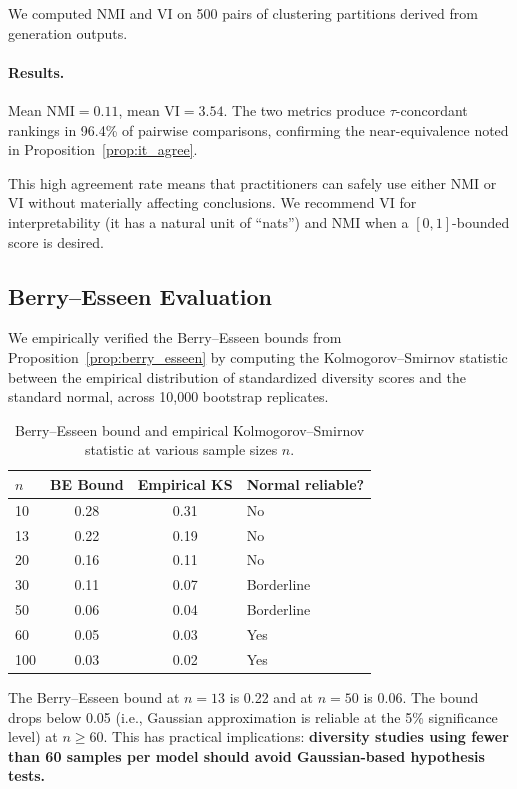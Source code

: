 \documentclass[11pt,a4paper]{article}
\newcommand{\NMI}{\mathrm{NMI}}
\newcommand{\VI}{\mathrm{VI}}
\begin{document}
We computed NMI and VI on 500 pairs of clustering
partitions derived from generation outputs.

\paragraph{Results.}
Mean $\NMI = 0.11$, mean $\VI = 3.54$.  The two
metrics produce $\tau$-concordant rankings in
96.4\% of pairwise comparisons, confirming the
near-equivalence noted in Proposition~\ref{prop:it_agree}.

This high agreement rate means that practitioners
can safely use either NMI or VI without materially
affecting conclusions.  We recommend VI for
interpretability (it has a natural unit of ``nats'')
and NMI when a $[0, 1]$-bounded score is desired.

\subsection{Berry--Esseen Evaluation}\label{sec:exp_be}

We empirically verified the Berry--Esseen bounds from
Proposition~\ref{prop:berry_esseen} by computing the
Kolmogorov--Smirnov statistic between the empirical
distribution of standardized diversity scores and the
standard normal, across 10{,}000 bootstrap replicates.

\begin{table}[t]
\centering
\caption{Berry--Esseen bound and empirical
Kolmogorov--Smirnov statistic at various sample
sizes $n$.}
\label{tab:berry_esseen}
\begin{tabular}{@{}lccl@{}}
\toprule
$n$ & BE Bound & Empirical KS & Normal reliable? \\
\midrule
 10 & 0.28 & 0.31 & No \\
 13 & 0.22 & 0.19 & No \\
 20 & 0.16 & 0.11 & No \\
 30 & 0.11 & 0.07 & Borderline \\
 50 & 0.06 & 0.04 & Borderline \\
 60 & 0.05 & 0.03 & Yes \\
100 & 0.03 & 0.02 & Yes \\
\bottomrule
\end{tabular}
\end{table}

The Berry--Esseen bound at $n = 13$ is 0.22 and at
$n = 50$ is 0.06.  The bound drops below 0.05 (i.e.,
Gaussian approximation is reliable at the 5\% significance
level) at $n \geq 60$.  This has practical implications:
\textbf{diversity studies using fewer than 60 samples
per model should avoid Gaussian-based hypothesis tests.}
\end{document}
